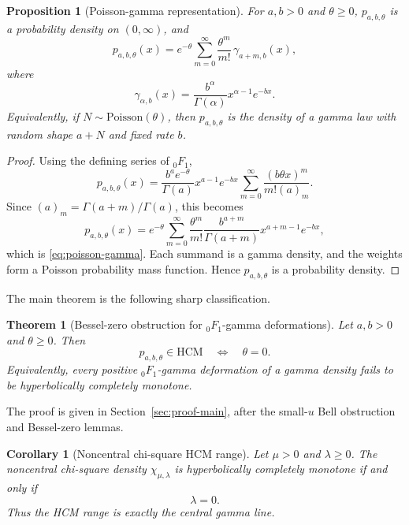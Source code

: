 ﻿\documentclass[preprint,12pt,authoryear]{elsarticle}
\newtheorem{theorem}{Theorem}
\newtheorem{proposition}{Proposition}
\newtheorem{corollary}{Corollary}
\newcommand{\HCM}{\mathrm{HCM}}
\begin{document}
\begin{proposition}[Poisson-gamma representation]
\label{prop:poisson-gamma}
For \(a,b>0\) and \(\theta\ge0\), \(p_{a,b,\theta}\) is a probability density on \((0,\infty)\), and
\begin{equation}
\label{eq:poisson-gamma}
p_{a,b,\theta}(x)
=
e^{-\theta}\sum_{m=0}^{\infty}
\frac{\theta^m}{m!}\,
\gamma_{a+m,b}(x),
\end{equation}
where
\begin{equation}
\gamma_{\alpha,b}(x)
=
\frac{b^\alpha}{\Gamma(\alpha)}x^{\alpha-1}e^{-bx}.
\end{equation}
Equivalently, if \(N\sim\mathrm{Poisson}(\theta)\), then \(p_{a,b,\theta}\) is the density of a gamma law with random shape \(a+N\) and fixed rate \(b\).
\end{proposition}

\begin{proof}
Using the defining series of \({}_0F_1\),
\begin{equation}
p_{a,b,\theta}(x)
=
\frac{b^a e^{-\theta}}{\Gamma(a)}
x^{a-1}e^{-bx}
\sum_{m=0}^{\infty}
\frac{(b\theta x)^m}{m!(a)_m}.
\end{equation}
Since \((a)_m=\Gamma(a+m)/\Gamma(a)\), this becomes
\begin{equation}
p_{a,b,\theta}(x)
=
e^{-\theta}
\sum_{m=0}^{\infty}
\frac{\theta^m}{m!}
\frac{b^{a+m}}{\Gamma(a+m)}x^{a+m-1}e^{-bx},
\end{equation}
which is \eqref{eq:poisson-gamma}.  Each summand is a gamma density, and the weights form a Poisson probability mass function.  Hence \(p_{a,b,\theta}\) is a probability density.
\end{proof}

The main theorem is the following sharp classification.

\begin{theorem}[Bessel-zero obstruction for \({}_0F_1\)-gamma deformations]
\label{thm:main}
Let \(a,b>0\) and \(\theta\ge0\).  Then
\begin{equation}
p_{a,b,\theta}\in\HCM
\quad\Longleftrightarrow\quad
\theta=0.
\end{equation}
Equivalently, every positive \({}_0F_1\)-gamma deformation of a gamma density fails to be hyperbolically completely monotone.
\end{theorem}

The proof is given in Section~\ref{sec:proof-main}, after the small-\(u\) Bell obstruction and Bessel-zero lemmas.

\begin{corollary}[Noncentral chi-square HCM range]
\label{cor:noncentral-chi-square}
Let \(\mu>0\) and \(\lambda\ge0\).  The noncentral chi-square density \(\chi_{\mu,\lambda}\) is hyperbolically completely monotone if and only if
\begin{equation}
\lambda=0.
\end{equation}
Thus the HCM range is exactly the central gamma line.
\end{corollary}
\end{document}
